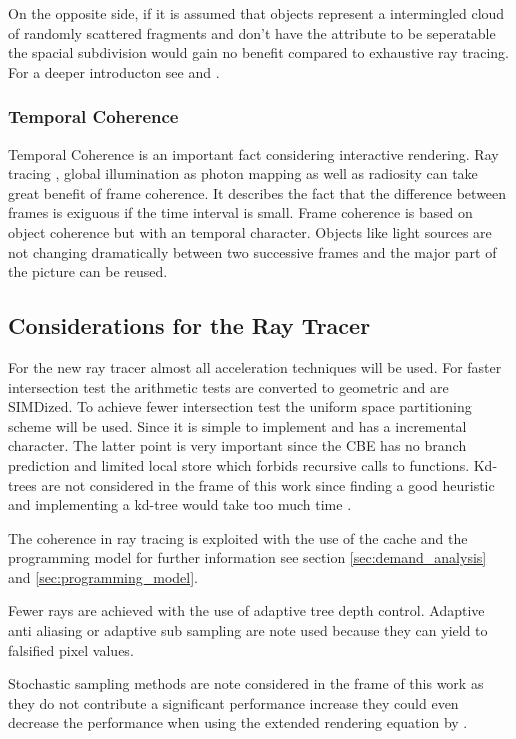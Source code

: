 \documentclass[DIV10, abstracton, openright, footsepline, headsepline, twoside, 9pt,
bigheadings]{scrreprt}
\begin{document}
On the opposite side, if it is assumed that objects represent a intermingled
cloud of randomly scattered fragments and don't have the attribute to be
seperatable the spacial subdivision would gain no benefit compared to exhaustive
ray tracing.\\
For a deeper introducton see \cite{KaplanM87} and \cite{ChapmanCalvertDill90}.

\subsubsection{Temporal Coherence}

Temporal Coherence is an important fact considering interactive rendering.
Ray tracing , global illumination as photon mapping as well as radiosity
can take great benefit of frame coherence. It describes the
fact that the difference between frames is exiguous if the time interval is
small. Frame coherence is based on object coherence but with an temporal
character. Objects like light sources are not changing dramatically
between two successive frames and the major part of the picture can be reused.


\subsection{Considerations for the Ray Tracer}
For the  new ray tracer almost all acceleration techniques will be used. For faster
intersection test the arithmetic tests are converted to geometric and are SIMDized.
To achieve fewer intersection test the uniform space partitioning scheme will be used.
Since it is simple to implement and has a incremental character. The latter point
is very important since the CBE has no branch prediction and limited local store
which forbids recursive calls to functions. Kd-trees are not considered in the frame
of this work since finding a good heuristic and implementing a kd-tree would take too
much time \cite{Havran2000:PhD}.

The coherence in ray tracing is exploited with the
use of the cache and the programming model for further information see section
\ref{sec:demand_analysis} and \ref{sec:programming_model}.


Fewer rays are achieved with the use of adaptive tree depth control. Adaptive anti
aliasing or adaptive sub sampling are note used because they can yield to falsified
pixel values.

Stochastic sampling methods are note considered in the frame of this work as
they do not contribute a significant performance increase they could even
decrease the performance when using the extended rendering equation by
\cite{Kajiya86}.
\end{document}
